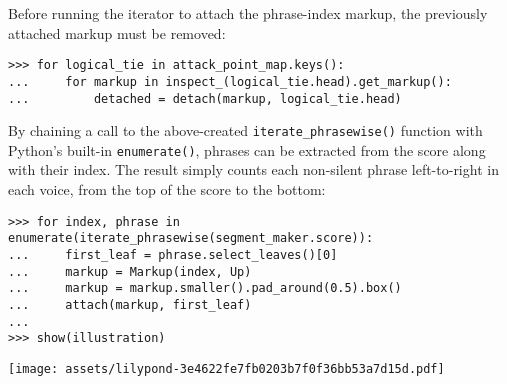 \noindent Before running the iterator to attach the phrase-index markup, the
previously attached markup must be removed:

\begin{comment}
<abjad>[stylesheet=../consort.ily]
for logical_tie in attack_point_map.keys():
    for markup in inspect_(logical_tie.head).get_markup():
        detached = detach(markup, logical_tie.head)
</abjad>
\end{comment}

\begin{abjadbookoutput}
\begin{singlespacing}
\vspace{-0.5\baselineskip}
\begin{lstlisting}
>>> for logical_tie in attack_point_map.keys():
...     for markup in inspect_(logical_tie.head).get_markup():
...         detached = detach(markup, logical_tie.head)
\end{lstlisting}
\end{singlespacing}
\end{abjadbookoutput}

\noindent By chaining a call to the above-created
\texttt{iterate\_phrasewise()} function with Python's built-in
\texttt{enumerate()}, phrases can be extracted from the score along with their
index. The result simply counts each non-silent phrase left-to-right in each
voice, from the top of the score to the bottom:

\begin{comment}
<abjad>[stylesheet=../consort.ily]
for index, phrase in enumerate(iterate_phrasewise(segment_maker.score)):
    first_leaf = phrase.select_leaves()[0]
    markup = Markup(index, Up)
    markup = markup.smaller().pad_around(0.5).box()
    attach(markup, first_leaf)

show(illustration)
</abjad>
\end{comment}

\begin{abjadbookoutput}
\begin{singlespacing}
\vspace{-0.5\baselineskip}
\begin{lstlisting}
>>> for index, phrase in enumerate(iterate_phrasewise(segment_maker.score)):
...     first_leaf = phrase.select_leaves()[0]
...     markup = Markup(index, Up)
...     markup = markup.smaller().pad_around(0.5).box()
...     attach(markup, first_leaf)
...
>>> show(illustration)
\end{lstlisting}
\noindent\texttt{[image: assets/lilypond-3e4622fe7fb0203b7f0f36bb53a7d15d.pdf]}
\end{singlespacing}
\end{abjadbookoutput}

